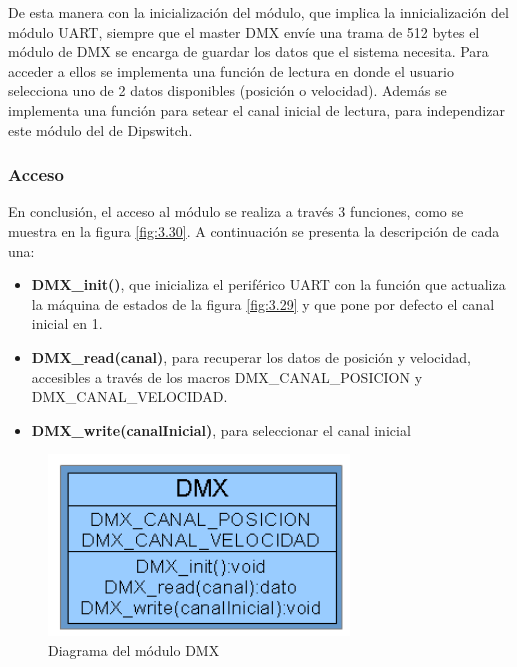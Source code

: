 De esta manera con la inicialización del módulo, que implica la innicialización del módulo UART, siempre que el master DMX envíe una trama de 512 bytes el módulo de DMX se encarga de guardar los datos que el sistema necesita. Para acceder a ellos se implementa una función de lectura en donde el usuario selecciona uno de 2 datos disponibles (posición o velocidad). Además se implementa una función para setear el canal inicial de lectura, para independizar este módulo del de Dipswitch.

\subsubsection{Acceso}
En conclusión, el acceso al módulo se realiza a través 3 funciones, como se muestra en la figura \ref{fig:3.30}. A continuación se presenta la descripción de cada una:
\begin{itemize}
	\item \textbf{DMX\_init()}, que inicializa el periférico UART con la función que actualiza la máquina de estados de la figura \ref{fig:3.29} y que pone por defecto el canal inicial en 1.
	\item \textbf{DMX\_read(canal)}, para recuperar los datos de posición y velocidad, accesibles a través de los macros DMX\_CANAL\_POSICION y DMX\_CANAL\_VELOCIDAD.
	\item \textbf{DMX\_write(canalInicial)}, para seleccionar el canal inicial
\end{itemize}

\begin{figure}[!ht]
	\centering
	\includegraphics[width=8cm,scale=1]{resources/3_30-moduloDMX.png}
	\caption{Diagrama del módulo DMX}
	\label{fig:\thefigure}
\end{figure}
 


